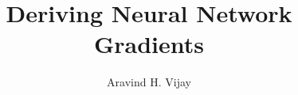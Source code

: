 
\title{Deriving Neural Network Gradients}
\author{Aravind H. Vijay}


    {\maketitle}
    {\tableofcontents}
    {\newpage}
	

